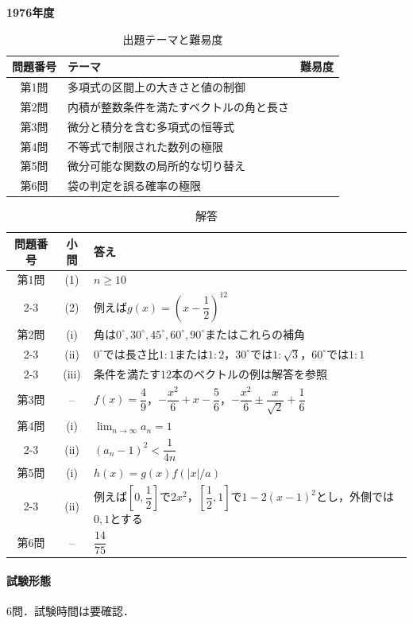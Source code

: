 \documentclass[../../main.tex]{subfiles}
\begin{document}
\begin{center}
  {\fontsize{48pt}{58pt}\selectfont \textbf{1976}\normalsize\textbf{年度}}
\end{center}

\begin{table}[htb]
  \centering
  \caption{出題テーマと難易度}
  \begin{tabular}{|c|p{9cm}|c|}
    \hline
    \textbf{問題番号} & \textbf{テーマ} & \textbf{難易度} \\
    \hline
    第1問 & 多項式の区間上の大きさと値の制御 & \\
    \hline
    第2問 & 内積が整数条件を満たすベクトルの角と長さ & \\
    \hline
    第3問 & 微分と積分を含む多項式の恒等式 & \\
    \hline
    第4問 & 不等式で制限された数列の極限 & \\
    \hline
    第5問 & 微分可能な関数の局所的な切り替え & \\
    \hline
    第6問 & 袋の判定を誤る確率の極限 & \\
    \hline
  \end{tabular}
\end{table}

\begin{table}[htb]
  \centering
  \caption{解答}
  \renewcommand{\arraystretch}{1.4}
  \begin{tabular}{|c|c|p{9cm}|}
    \hline
    \textbf{問題番号} & \textbf{小問} & \textbf{答え} \\
    \hline
    第1問 & (1) & $n\ge10$ \\
    \cline{2-3}
    & (2) & 例えば$g(x)=(x-\dfrac{1}{2})^{12}$ \\
    \hline
    第2問 & (i) & 角は$0^\circ,30^\circ,45^\circ,60^\circ,90^\circ$またはこれらの補角 \\
    \cline{2-3}
    & (ii) & $0^\circ$では長さ比$1:1$または$1:2$，$30^\circ$では$1:\sqrt{3}$，$60^\circ$では$1:1$ \\
    \cline{2-3}
    & (iii) & 条件を満たす$12$本のベクトルの例は解答を参照 \\
    \hline
    第3問 & -- & $f(x)=\dfrac{4}{9}$，$-\dfrac{x^2}{6}+x-\dfrac{5}{6}$，$-\dfrac{x^2}{6}\pm\dfrac{x}{\sqrt{2}}+\dfrac{1}{6}$ \\
    \hline
    第4問 & (i) & $\displaystyle\lim_{n\to\infty}a_n=1$ \\
    \cline{2-3}
    & (ii) & $(a_n-1)^2<\dfrac{1}{4n}$ \\
    \hline
    第5問 & (i) & $h(x)=g(x)f(|x|/a)$ \\
    \cline{2-3}
    & (ii) & 例えば$[0,\dfrac{1}{2}]$で$2x^2$，$[\dfrac{1}{2},1]$で$1-2(x-1)^2$とし，外側では$0,1$とする \\
    \hline
    第6問 & -- & $\dfrac{14}{75}$ \\
    \hline
  \end{tabular}
\end{table}

\paragraph{試験形態}
6問．試験時間は要確認．
\end{document}
